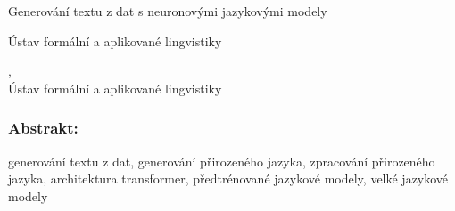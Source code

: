 \documentclass[12pt,notitlepage,a4paper,openright]{report}
\begin{document}
\cleardoublepage{}
\begin{description}[leftmargin=7.5em,labelwidth=7em,labelindent=0em,labelsep=0.5em]
    \item[Název práce:] Generování textu z dat s neuronovými jazykovými modely
    \item[Autor:] \theauthor{}
    \item[Katedra:] Ústav formální a aplikované lingvistiky
    \item[Vedoucí práce:] \thesupervisor,\\ Ústav formální a aplikované lingvistiky
\end{description}

\subsubsection{Abstrakt:}



\begin{description}[leftmargin=7.5em,labelwidth=7em,labelindent=0em,labelsep=0.5em]
    \item[Klíčová slova:] generování textu z dat, generování přirozeného jazyka, zpracování přirozeného jazyka, architektura transformer, předtrénované jazykové modely, velké jazykové modely
\end{description}





\cleardoublepage{}
\ \vspace{10mm}

\end{document}
